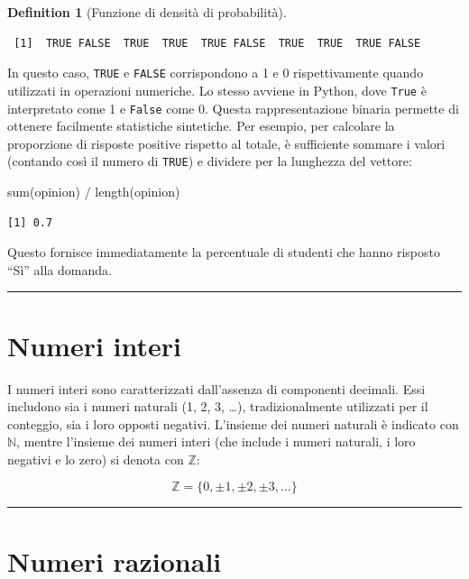 \documentclass[
  letterpaper,
  DIV=11,
  numbers=noendperiod,
  oneside]{scrreprt}
\newenvironment{Shaded}{\begin{snugshade}}{\end{snugshade}}
\newcommand{\FunctionTok}[1]{\textcolor[rgb]{0.28,0.35,0.67}{#1}}
\newcommand{\NormalTok}[1]{\textcolor[rgb]{0.00,0.23,0.31}{#1}}
\newcommand{\SpecialCharTok}[1]{\textcolor[rgb]{0.37,0.37,0.37}{#1}}
\theoremstyle{definition}
\theoremstyle{plain}
\theoremstyle{definition}
\newtheorem{definition}{Definition}[chapter]
\theoremstyle{remark}
\begin{document}
\begin{definition}[Funzione di densità di
probabilità]
\begin{verbatim}
 [1]  TRUE FALSE  TRUE  TRUE  TRUE FALSE  TRUE  TRUE  TRUE FALSE
\end{verbatim}

In questo caso, \texttt{TRUE} e \texttt{FALSE} corrispondono a 1 e 0
rispettivamente quando utilizzati in operazioni numeriche. Lo stesso
avviene in Python, dove \texttt{True} è interpretato come 1 e
\texttt{False} come 0. Questa rappresentazione binaria permette di
ottenere facilmente statistiche sintetiche. Per esempio, per calcolare
la proporzione di risposte positive rispetto al totale, è sufficiente
sommare i valori (contando così il numero di \texttt{TRUE}) e dividere
per la lunghezza del vettore:

\begin{Shaded}
\begin{Highlighting}[]
\FunctionTok{sum}\NormalTok{(opinion) }\SpecialCharTok{/} \FunctionTok{length}\NormalTok{(opinion)}
\end{Highlighting}
\end{Shaded}

\begin{verbatim}
[1] 0.7
\end{verbatim}

Questo fornisce immediatamente la percentuale di studenti che hanno
risposto ``Sì'' alla domanda.

\begin{center}\rule{0.5\linewidth}{0.5pt}\end{center}

\section{Numeri interi}\label{numeri-interi}

I numeri interi sono caratterizzati dall'assenza di componenti decimali.
Essi includono sia i numeri naturali (1, 2, 3, \ldots), tradizionalmente
utilizzati per il conteggio, sia i loro opposti negativi. L'insieme dei
numeri naturali è indicato con \(\mathbb{N}\), mentre l'insieme dei
numeri interi (che include i numeri naturali, i loro negativi e lo zero)
si denota con \(\mathbb{Z}\):

\[
\mathbb{Z} = \{0, \pm 1, \pm 2, \pm 3, \dots\}
\]

\begin{center}\rule{0.5\linewidth}{0.5pt}\end{center}

\section{Numeri razionali}\label{numeri-razionali}


\end{definition}
\end{document}
